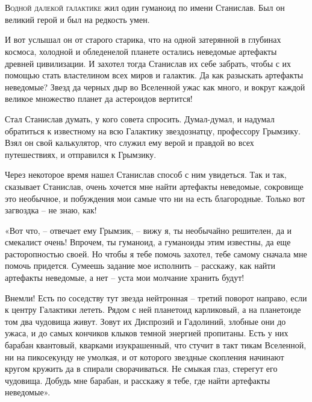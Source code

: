 \documentclass[ebook,oneside,final,openright]{memoir}
\begin{document}
\chapter{}
 \lettrine{В}{одной далекой галактике} жил один гуманоид по имени Станислав. Был он великий герой и был на редкость умен.\par
\par
И вот услышал он от старого старика, что на одной затерянной в глубинах космоса, холодной и обледенелой планете остались неведомые артефакты древней цивилизации. И захотел тогда Станислав их себе забрать, чтобы с их помощью стать властелином всех миров и галактик. Да как разыскать артефакты неведомые? Звезд да черных дыр во Вселенной ужас как много, и вокруг каждой великое множество планет да астероидов вертится!\par
\par
Стал Станислав думать, у кого совета спросить. Думал-думал, и надумал обратиться к известному на всю Галактику звездознатцу, профессору Грымзику. Взял он свой калькулятор, что служил ему верой и правдой во всех путешествиях, и отправился к Грымзику.\par
\par
Через некоторое время нашел Станислав способ с ним увидеться. Так и так, сказывает Станислав, очень хочется мне найти артефакты неведомые, сокровище это необычное, и побуждения мои самые что ни на есть благородные. Только вот загвоздка – не знаю, как!\par
\par
«Вот что, – отвечает ему Грымзик, – вижу я, ты необычайно решителен, да и смекалист очень! Впрочем, ты гуманоид, а гуманоиды этим известны, да еще расторопностью своей. Но чтобы я тебе помочь захотел, тебе самому сначала мне помочь придется. Сумеешь задание мое исполнить – расскажу, как найти артефакты неведомые, а нет – уста мои молчание хранить будут!\par
\par
Внемли! Есть по соседству тут звезда нейтронная – третий поворот направо, если к центру Галактики лететь. Рядом с ней планетоид карликовый, а на планетоиде том два чудовища живут. Зовут их Диспрозий и Гадолиний, злобные они до ужаса, и до самых кончиков клыков темной энергией пропитаны. Есть у них барабан квантовый, кварками изукрашенный, что стучит в такт тикам Вселенной, ни на пикосекунду не умолкая, и от которого звездные скопления начинают кругом кружить да в спирали сворачиваться. Не смыкая глаз, стерегут его чудовища. Добудь мне барабан, и расскажу я тебе, где найти артефакты неведомые».\par
\end{document}
